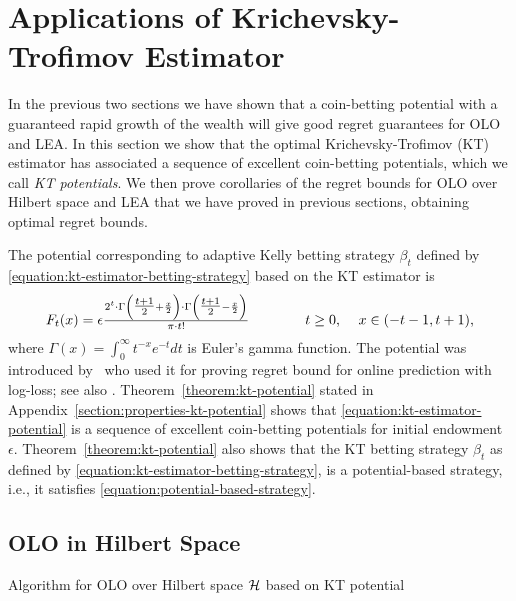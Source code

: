 \section{Applications of Krichevsky-Trofimov Estimator}
\label{section:kt-estimator}

In the previous two sections we have shown that a coin-betting potential with a
guaranteed rapid growth of the wealth will give good regret guarantees for
\ac{OLO} and \ac{LEA}. In this section we show that the optimal
Krichevsky-Trofimov (KT) estimator has associated a sequence of excellent
coin-betting potentials, which we call \emph{KT potentials}. We then prove
corollaries of the regret bounds for \ac{OLO} over Hilbert space and \ac{LEA}
that we have proved in previous sections, obtaining optimal regret bounds.

The potential corresponding to adaptive Kelly betting strategy
$\beta_t$ defined by \eqref{equation:kt-estimator-betting-strategy}
based on the KT estimator is
\begin{equation}
\label{equation:kt-estimator-potential}
F_t(x) = \epsilon \tfrac{2^t \cdot \Gamma \left( \tfrac{t+1}{2} + \frac{x}{2} \right) \cdot \Gamma \left( \tfrac{t+1}{2} - \frac{x}{2} \right)}{\pi \cdot t!}
\qquad \qquad \text{$t \ge 0$, \quad $x \in \left(-t-1, t+1\right)$,}
\end{equation}
where $\Gamma(x) = \int_0^\infty t^{-x} e^{-t} dt$ is Euler's gamma function.
The potential was introduced by~\citet{Krichevsky-Trofimov-1981} who used it
for proving regret bound for online prediction with log-loss; see also
\cite[Section 9.7]{Cesa-Bianchi-Lugosi-2006}.
Theorem~\ref{theorem:kt-potential} stated in
Appendix~\ref{section:properties-kt-potential} shows that
\eqref{equation:kt-estimator-potential} is a sequence of excellent coin-betting
potentials for initial endowment $\epsilon$. Theorem~\ref{theorem:kt-potential}
also shows that the KT betting strategy $\beta_t$ as defined by
\eqref{equation:kt-estimator-betting-strategy}, is a potential-based strategy,
i.e., it satisfies \eqref{equation:potential-based-strategy}.

\subsection{OLO in Hilbert Space}
\label{section:kt-olo}

\begin{algorithm}[t]
\caption{Algorithm for OLO over Hilbert space $\mathcal{H}$ based on KT potential
\label{algorithm:kt-hilbert-space-olo}}
\begin{algorithmic}[1]
{
\ENDFOR
}
\end{algorithmic}
\end{algorithm}

